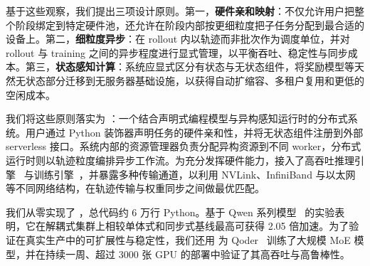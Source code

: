 基于这些观察，我们提出三项设计原则。第一，\textbf{硬件亲和映射}：不仅允许用户把整个阶段绑定到特定硬件池，还允许在阶段内部按更细粒度把子任务分配到最合适的设备上。第二，\textbf{细粒度异步}：在 rollout 内以轨迹而非批次作为调度单位，并对 rollout 与 training 之间的异步程度进行显式管理，以平衡吞吐、稳定性与同步成本。第三，\textbf{状态感知计算}：系统应显式区分有状态与无状态组件，将奖励模型等天然无状态部分迁移到无服务器基础设施，以获得自动扩缩容、多租户复用和更低的空闲成本。

我们将这些原则落实为 \SystemName{}：一个结合声明式编程模型与异构感知运行时的分布式系统。用户通过 Python 装饰器声明任务的硬件亲和性，并将无状态组件注册到外部 serverless 接口。系统内部的资源管理器负责分配异构资源到不同 worker，分布式运行时则以轨迹粒度编排异步工作流。为充分发挥硬件能力，\SystemName{}接入了高吞吐推理引擎~\cite{vllm, sglang,rtp-llm} 与训练引擎~\cite{shoeybi2019megatron}，并暴露多种传输通道，以利用 NVLink、InfiniBand 与以太网等不同网络结构，在轨迹传输与权重同步之间做最优匹配。

我们从零实现了 \SystemName{}，总代码约 6 万行 Python。基于 Qwen 系列模型~\cite{qwen-huggingface} 的实验表明，它在解耦式集群上相较单体式和同步式基线最高可获得 2.05 倍加速。为了验证在真实生产中的可扩展性与稳定性，我们还用 \SystemName{} 为 Qoder~\cite{qoder} 训练了大规模 MoE 模型，并在持续一周、超过 3000 张 GPU 的部署中验证了其高吞吐与高鲁棒性。
